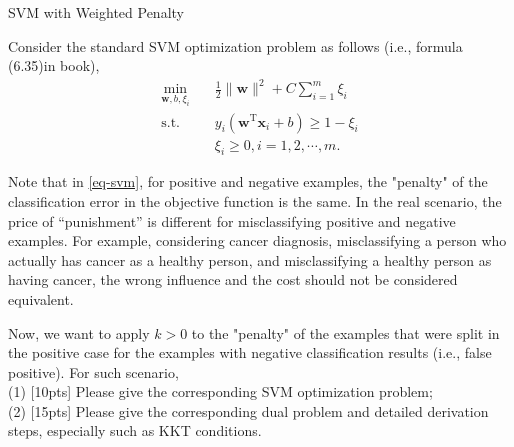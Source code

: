 \documentclass[11pt, a4paper, UTF8]{ctexart}
\begin{document}
\begin{problem}[ML problem 2]
	[25pts] SVM with Weighted Penalty
	
 Consider the standard SVM optimization problem as follows (i.e., formula (6.35)in book),
\begin{equation}
\label{eq-svm}
\begin{split}
\min_{\mathbf{w},b,\xi_i}& \quad \frac{1}{2} \lVert \mathbf{w} \rVert^2 + C\sum_{i=1}^m\xi_i\\
\text{s.t.}&  \quad y_i(\mathbf{w}^\mathrm{T}\mathbf{x}_i + b)\geq 1-\xi_i\\
& \quad \xi_i \geq 0, i = 1,2,\cdots,m.
\end{split}
\end{equation}

Note that in \eqref{eq-svm}, for positive and negative examples, the "penalty" of the classification error in the objective function is the same. In the real scenario, the price of “punishment” is different for misclassifying positive and negative examples. For example, considering cancer diagnosis, misclassifying a person who actually has cancer as a healthy person, and misclassifying a healthy person as having cancer, the wrong influence and the cost should not be considered equivalent.

Now, we want to apply $k>0$ to the "penalty" of the examples that were split in the positive case for the examples with negative classification results (i.e., false positive). For such scenario,\\
(1) [10pts] Please give the corresponding SVM optimization problem;\\
(2) [15pts] Please give the corresponding dual problem and detailed derivation steps, especially such as KKT conditions.


\end{problem}
\end{document}
